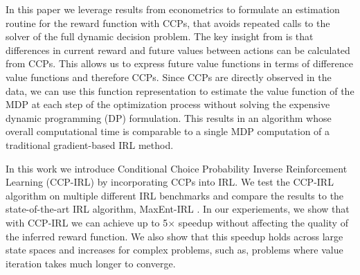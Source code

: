 \documentclass{article}
\begin{document}
In this paper we leverage results from econometrics \cite{rust_gmc, hotz, magnac} to formulate an estimation routine for the reward function with CCPs, that avoids repeated calls to the solver of the full dynamic decision problem.
The key insight from \cite{hotz} is that differences in current reward and future values between actions can be calculated from CCPs. This allows us to express future value functions in terms of difference value functions and therefore CCPs. Since CCPs are directly observed in the data, we can use this function representation to estimate the value function of the MDP at each step of the optimization process without solving the expensive dynamic programming (DP) formulation. This results in an algorithm whose overall computational time is comparable to a single MDP computation of a traditional gradient-based IRL method. 

In this work we introduce Conditional Choice Probability Inverse Reinforcement Learning (CCP-IRL) by incorporating CCPs into IRL. We test the CCP-IRL algorithm on multiple different IRL benchmarks and compare the results to the state-of-the-art IRL algorithm, MaxEnt-IRL \cite{ziebart}. In our experiements, we show that with CCP-IRL we can achieve up to 5$\times$ speedup without affecting the quality of the inferred reward function. We also show that this speedup holds across large state spaces and increases for complex problems, such as, problems where value iteration takes much longer to converge. 




\end{document}
